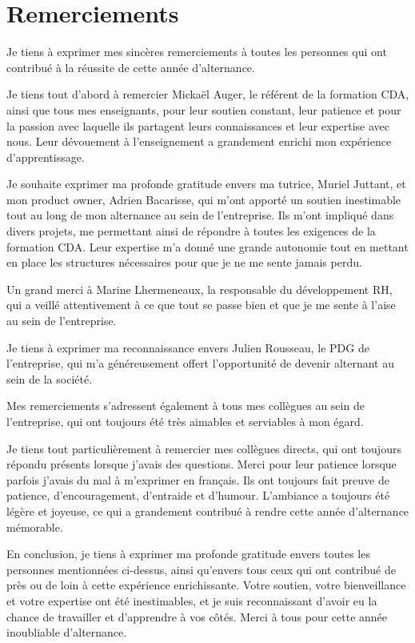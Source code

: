 \chapter{Remerciements}\label{ch:remerciements}

Je tiens à exprimer mes sincères remerciements à toutes les personnes qui ont contribué à la réussite de cette année d'alternance.

Je tiens tout d'abord à remercier Mickaël Auger, le référent de la formation CDA, ainsi que tous mes enseignants, pour leur soutien constant, leur patience et pour la passion avec laquelle ils partagent leurs connaissances et leur expertise avec nous. Leur dévouement à l'enseignement a grandement enrichi mon expérience d'apprentissage.

Je souhaite exprimer ma profonde gratitude envers ma tutrice, Muriel Juttant, et mon product owner, Adrien Bacarisse, qui m'ont apporté un soutien inestimable tout au long de mon alternance au sein de l'entreprise. Ils m'ont impliqué dans divers projets, me permettant ainsi de répondre à toutes les exigences de la formation CDA. Leur expertise m'a donné une grande autonomie tout en mettant en place les structures nécessaires pour que je ne me sente jamais perdu.

Un grand merci à Marine Lhermeneaux, la responsable du développement RH, qui a veillé attentivement à ce que tout se passe bien et que je me sente à l'aise au sein de l'entreprise.

Je tiens à exprimer ma reconnaissance envers Julien Rousseau, le PDG de l'entreprise, qui m'a généreusement offert l'opportunité de devenir alternant au sein de la société.

Mes remerciements s'adressent également à tous mes collègues au sein de l'entreprise, qui ont toujours été très aimables et serviables à mon égard.

Je tiens tout particulièrement à remercier mes collègues directs, qui ont toujours répondu présents lorsque j'avais des questions. Merci pour leur patience lorsque parfois j'avais du mal à m'exprimer en français. Ils ont toujours fait preuve de patience, d'encouragement, d'entraide et d'humour. L'ambiance a toujours été légère et joyeuse, ce qui a grandement contribué à rendre cette année d'alternance mémorable.

En conclusion, je tiens à exprimer ma profonde gratitude envers toutes les personnes mentionnées ci-dessus, ainsi qu'envers tous ceux qui ont contribué de près ou de loin à cette expérience enrichissante. Votre soutien, votre bienveillance et votre expertise ont été inestimables, et je suis reconnaissant d'avoir eu la chance de travailler et d'apprendre à vos côtés. Merci à tous pour cette année inoubliable d'alternance.